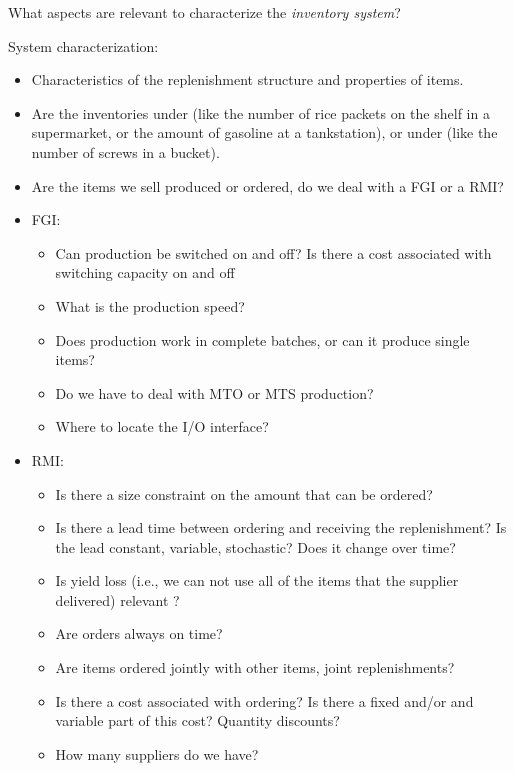 \begin{exercise}
  What aspects are relevant to characterize the \emph{inventory system}?
\begin{solution}
 System characterization: 
      \begin{itemize}
      \item Characteristics of the replenishment structure and properties of items. 
      \item Are the inventories under  (like the number of rice packets on the shelf in a supermarket, or the amount of gasoline at a tankstation), or under  (like the number of screws in a bucket).
      \item Are the items we sell produced or ordered, do we deal with a FGI or a RMI? 
      \item FGI:
      \begin{itemize}
      \item Can production be switched on and off?  Is there a cost
        associated with switching capacity on and off
      \item What is the production speed?
      \item Does production work in complete batches, or can it produce single items?
      \item Do we have to deal with MTO or MTS production? 
      \item Where to locate the I/O interface?
      \end{itemize}
    \item RMI:
      \begin{itemize}
      \item Is there a size constraint on the amount that can be ordered? 
      \item Is there a lead time between ordering and receiving the
        replenishment? Is the lead constant, variable, stochastic?
        Does it change over time?
      \item Is yield loss (i.e., we can not use all of the items that
        the supplier delivered) relevant ?
      \item Are orders always on time?
      \item Are items ordered jointly with other items, joint
        replenishments?
      \item Is there a cost associated with ordering? Is there a fixed
        and/or and variable part of this cost? Quantity discounts?
      \item How many suppliers do we have?

\end{itemize}
\end{itemize}
\end{solution}
\end{exercise}
